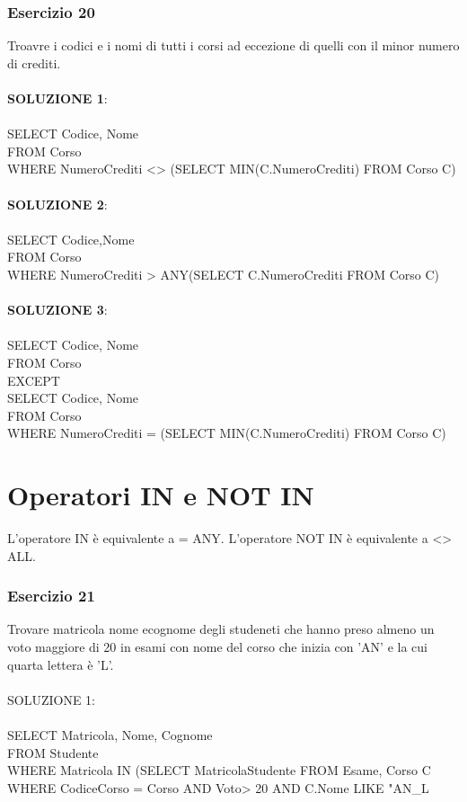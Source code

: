 \documentclass[12pt,a4paper]{book}
\begin{document}
\subsubsection{Esercizio 20}
Troavre i codici e i nomi di tutti i corsi ad eccezione di quelli con il minor numero di crediti.\\
\\
\textbf{SOLUZIONE 1}:\\
\\
SELECT Codice, Nome\\
FROM Corso\\
WHERE NumeroCrediti <> (SELECT MIN(C.NumeroCrediti) FROM Corso C)\\
\\
\textbf{SOLUZIONE 2}:\\
\\
SELECT Codice,Nome\\
FROM Corso\\
WHERE NumeroCrediti > ANY(SELECT C.NumeroCrediti FROM Corso C)\\
\\
\textbf{SOLUZIONE 3}:\\
\\
SELECT Codice, Nome\\
FROM Corso\\ 
EXCEPT\\
SELECT Codice, Nome\\
FROM Corso\\
WHERE NumeroCrediti = (SELECT MIN(C.NumeroCrediti) FROM Corso C)\\

\section{Operatori IN e NOT IN}
L'operatore IN è equivalente a = ANY.
L'operatore NOT IN è equivalente a <> ALL.

\subsubsection{Esercizio 21}
Trovare matricola nome  ecognome degli studeneti che hanno preso almeno un voto maggiore di 20 in esami con nome del corso che inizia con 'AN' e la cui quarta lettera è 'L'.\\
\\
SOLUZIONE 1:\\
\\
SELECT Matricola, Nome, Cognome\\
FROM Studente\\
WHERE Matricola IN (SELECT MatricolaStudente FROM Esame, Corso C WHERE CodiceCorso = Corso AND Voto> 20 AND C.Nome LIKE "AN_L%
\end{document}
